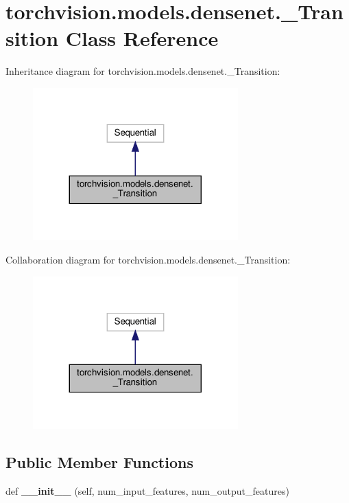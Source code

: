 \hypertarget{classtorchvision_1_1models_1_1densenet_1_1__Transition}{}\section{torchvision.\+models.\+densenet.\+\_\+\+Transition Class Reference}
\label{classtorchvision_1_1models_1_1densenet_1_1__Transition}


Inheritance diagram for torchvision.\+models.\+densenet.\+\_\+\+Transition\+:
\nopagebreak
\begin{figure}[H]
\begin{center}
\leavevmode
\includegraphics[width=224pt]{classtorchvision_1_1models_1_1densenet_1_1__Transition__inherit__graph}
\end{center}
\end{figure}


Collaboration diagram for torchvision.\+models.\+densenet.\+\_\+\+Transition\+:
\nopagebreak
\begin{figure}[H]
\begin{center}
\leavevmode
\includegraphics[width=224pt]{classtorchvision_1_1models_1_1densenet_1_1__Transition__coll__graph}
\end{center}
\end{figure}
\subsection*{Public Member Functions}
\begin{DoxyCompactItemize}
\item 
\mbox{\label{classtorchvision_1_1models_1_1densenet_1_1__Transition_a697041fed7c1b0b40cbc47efd273eb14}} 
def {\bfseries \+\_\+\+\_\+init\+\_\+\+\_\+} (self, num\+\_\+input\+\_\+features, num\+\_\+output\+\_\+features)
\end{DoxyCompactItemize}


